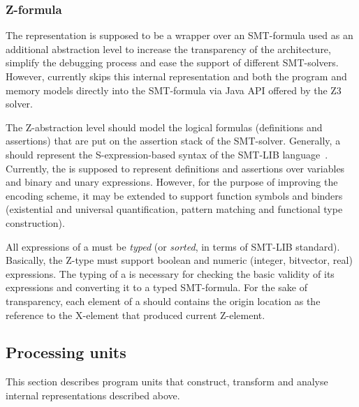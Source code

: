 \subsubsection{Z-formula}
\label{ch:impl:model:zformula}

The \textit{\zformula{}} representation is supposed to be a wrapper over an SMT-formula used as an additional abstraction level to increase the transparency of the architecture, simplify the debugging process and ease the support of different SMT-solvers.
However, currently \porthos[2] skips this internal representation and both the program and memory models directly into the SMT-formula via Java API offered by the Z3 solver.

The Z-abstraction level should model the logical formulas (definitions and assertions) that are put on the assertion stack of the SMT-solver.
Generally, a \zformula{} should represent the S-expression-based syntax of the SMT-LIB language~\cite{smt-lib}.
Currently, the \zformula{} is supposed to represent definitions and assertions over variables and binary and unary expressions.
However, for the purpose of improving the encoding scheme, it may be extended to support function symbols and binders (existential and universal quantification, pattern matching and functional type construction).

All expressions of a \zformula{} must be \textit{typed} (or \textit{sorted}, in terms of SMT-LIB standard).
Basically, the Z-type must support boolean and numeric (integer, bitvector, real) expressions.
The typing of a \zformula{} is necessary for checking the basic validity of its expressions and converting it to a typed SMT-formula.
For the sake of transparency, each element of a \zformula{} should contains the origin location as the reference to the X-element that produced current Z-element.


\subsection{Processing units} %
\label{ch:impl:proc}

This section describes program units that construct, transform and analyse internal representations described above.

